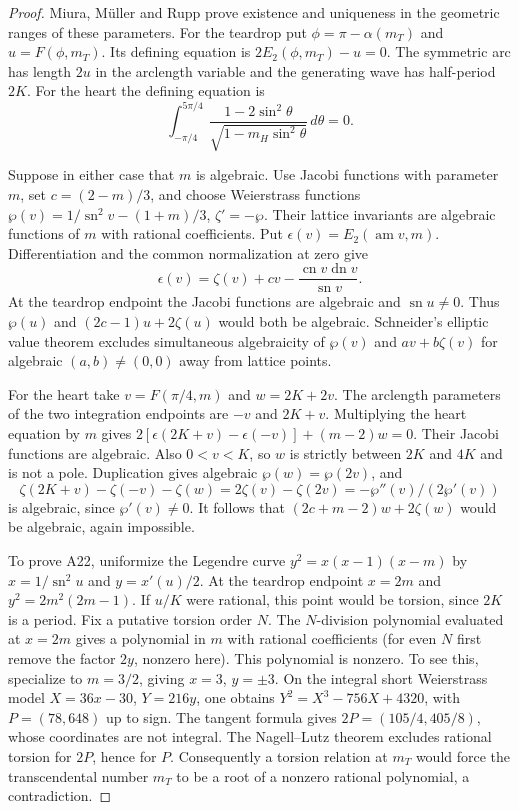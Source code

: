 \documentclass[11pt,a4paper]{article}
\theoremstyle{definition}
\theoremstyle{remark}
\begin{document}
\begin{proof}
Miura, M\"uller and Rupp \cite[\S2, Definitions 2.15 and 2.21]{aMMR}
prove existence and uniqueness in the geometric ranges of these parameters.
For the teardrop put $\phi=\pi-\alpha(m_T)$ and $u=F(\phi,m_T)$.
Its defining equation is $2E_2(\phi,m_T)-u=0$. The symmetric arc has
length $2u$ in the arclength variable and the generating wave has
half-period $2K$. For the heart the defining equation is
\[
 \int_{-\pi/4}^{5\pi/4}
       \frac{1-2\sin^2\theta}{\sqrt{1-m_H\sin^2\theta}}\,d\theta=0 .
\]

Suppose in either case that $m$ is algebraic. Use Jacobi functions
with parameter $m$, set $c=(2-m)/3$, and choose Weierstrass functions
$\wp(v)=1/\operatorname{sn}^2v-(1+m)/3$, $\zeta'=-\wp$. Their lattice invariants are algebraic functions of $m$ with rational coefficients. Put $\epsilon(v)=E_2(\operatorname{am}v,m)$.
Differentiation and the common normalization at zero give
\[
 \epsilon(v)=\zeta(v)+cv-
 \frac{\operatorname{cn}v\operatorname{dn}v}{\operatorname{sn}v}.
\]
At the teardrop endpoint the Jacobi functions are algebraic and
$\operatorname{sn}u\ne0$. Thus $\wp(u)$ and $(2c-1)u+2\zeta(u)$
would both be algebraic. Schneider's elliptic value theorem
\cite[Theorem 20(1)]{aWald} excludes simultaneous algebraicity of
$\wp(v)$ and $av+b\zeta(v)$ for algebraic $(a,b)\ne(0,0)$
away from lattice points.

For the heart take $v=F(\pi/4,m)$ and
$w=2K+2v$. The arclength parameters of the two integration endpoints
are $-v$ and $2K+v$. Multiplying the heart equation by $m$ gives
$2[\epsilon(2K+v)-\epsilon(-v)]+(m-2)w=0$.
Their Jacobi functions are algebraic. Also $0<v<K$, so $w$ is
strictly between $2K$ and $4K$ and is not a pole. Duplication gives
algebraic $\wp(w)=\wp(2v)$, and
\[
 \zeta(2K+v)-\zeta(-v)-\zeta(w)
     =2\zeta(v)-\zeta(2v)=-\wp''(v)/(2\wp'(v))
\]
is algebraic, since $\wp'(v)\ne0$. It follows that
$(2c+m-2)w+2\zeta(w)$ would be algebraic, again impossible.

To prove A22, uniformize the Legendre curve
$y^2=x(x-1)(x-m)$ by $x=1/\operatorname{sn}^2u$ and
$y=x'(u)/2$. At the teardrop endpoint $x=2m$ and
$y^2=2m^2(2m-1)$. If $u/K$ were rational, this point would be torsion,
since $2K$ is a period. Fix a putative torsion order $N$. The
$N$-division polynomial evaluated at $x=2m$ gives a polynomial in $m$
with rational coefficients (for even $N$ first remove the factor
$2y$, nonzero here). This polynomial is nonzero. To see this, specialize to
$m=3/2$, giving $x=3$, $y=\pm3$. On the integral short Weierstrass model
$X=36x-30$, $Y=216y$, one obtains
$Y^2=X^3-756X+4320$, with $P=(78,648)$ up to sign.
The tangent formula gives $2P=(105/4,405/8)$, whose coordinates are
not integral. The Nagell--Lutz theorem \cite[Chap.~VIII, \S7]{aSil}
excludes rational torsion for $2P$, hence for $P$. Consequently a torsion
relation at $m_T$ would force the transcendental number $m_T$ to be a root
of a nonzero rational polynomial, a contradiction.
\end{proof}
\end{document}
